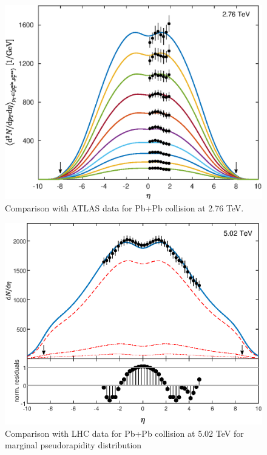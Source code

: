 \documentclass[a4paper,12pt]{book}
\begin{document}
\begin{figure}
	\begin{center}
		\centering
		\includegraphics[width=\linewidth]{images/Pb_276_plot_2d_eta.eps}
		\caption{Comparison with ATLAS data for Pb+Pb collision at 2.76 TeV.}
		\label{fig:Pb_276_2d_eta}
	\end{center}
\end{figure}

\begin{figure}
	\begin{center}
		\centering
		\includegraphics[width=\linewidth]{images/Pb_502_plot_eta_FP.eps}
		\caption{Comparison with LHC data for Pb+Pb collision at 5.02 TeV for marginal pseudorapidity distribution}
		\label{fig:Pb_502_eta}
	\end{center}
\end{figure}
\end{document}
